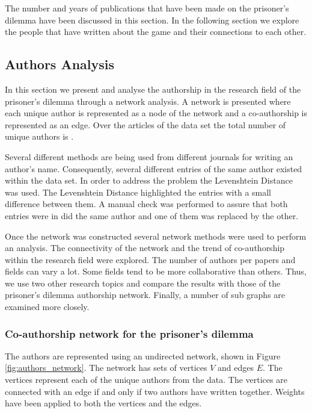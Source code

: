 \documentclass{article}
\newcommand{\uniquetitles}{}
\newcommand{\authors}{}
\begin{document}
The number and years of publications that have been made on the prisoner's dilemma
have been discussed in this section. In the following section we explore
the people that have written about the game and their connections to each other.

\subsection{Authors Analysis}

In this section we present and analyse the authorship in the research field of the
prisoner's dilemma through a network analysis. A network is presented where each
unique author is represented as a node of the network and
a co-authorship is represented as an edge. Over the \uniquetitles articles of the
data set the total number of unique authors is \authors. 

Several different methods are being used from different journals for writing an
author's name. Consequently, several different entries of the same author existed
within the data set. In order to address the problem the Levenshtein Distance~\cite{miller2009}
was used. The Levenshtein Distance highlighted the entries with a small difference
between them. A manual check was performed to assure that both entries were in
did the same author and one of them was replaced by the other.

Once the network was constructed several network methods were used to perform an
analysis. The connectivity of the network and the trend of co-authorship within
the research field were explored. The number of authors per papers and fields
can vary a lot. Some fields tend to be more collaborative than others. Thus, we
use two other research topics and compare the results with those of the
prisoner's dilemma authorship network. Finally, a number of sub graphs are
examined more closely.

\subsubsection{Co-authorship network for the prisoner's dilemma}
\label{section:co_authors_network_analysis}

The authors are represented using an undirected network, shown in Figure
\ref{fig:authors_network}. The network has sets of vertices \(V\) and edges \(E\).
The \authors vertices represent each of the unique authors from the data. 
The vertices are connected with an edge if and only if two authors have written
together. Weights have been applied to both the vertices and the edges.
\end{document}
